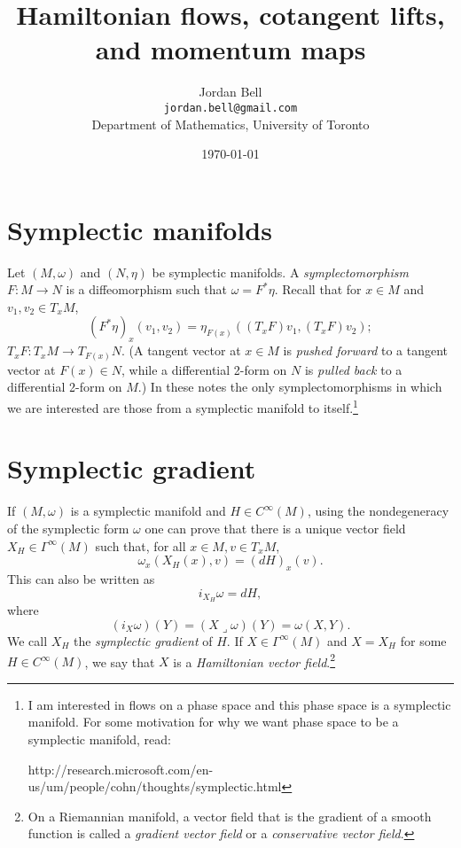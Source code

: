 \documentclass{article}
\begin{document}
\title{Hamiltonian flows, cotangent lifts, and momentum maps}
\author{Jordan Bell\\ \texttt{jordan.bell@gmail.com}\\Department of Mathematics, University of Toronto}
\date{\today}

\maketitle

\section{Symplectic manifolds}
Let $(M,\omega)$ and $(N,\eta)$ be symplectic manifolds. A {\em symplectomorphism} $F:M \to N$ is a diffeomorphism
such that $\omega=F^* \eta$. Recall that for $x \in M$ and $v_1,v_2 \in T_xM$,
\[
(F^* \eta)_x(v_1,v_2)=\eta_{F(x)}((T_x F)v_1,(T_x F)v_2);
\]
$T_x F: T_x M \to T_{F(x)}N$. (A tangent vector at $x \in M$ is {\em pushed forward} to a tangent vector at $F(x) \in N$, while a differential 2-form on $N$ is {\em pulled back} to a 
differential 2-form on $M$.) In these notes the only symplectomorphisms in which we are interested  are those from a symplectic manifold to itself.\footnote{I am interested in flows
on a phase space and this phase space is a symplectic manifold. For some motivation for why we want phase space to be a symplectic manifold, read:

 http://research.microsoft.com/en-us/um/people/cohn/thoughts/symplectic.html}

\section{Symplectic gradient}
If $(M,\omega)$ is a symplectic manifold and $H \in C^\infty(M)$, using the nondegeneracy of the symplectic form $\omega$ one can prove that there is a unique
vector field
$X_H \in \Gamma^\infty(M)$ 
such that, for all $x \in M, v \in T_xM$,
\[
\omega_x(X_H(x),v)=(dH)_x(v).
\]
This can also be written as 
\[
i_{X_H} \omega = dH,
\]
where 
\[
(i_X \omega)(Y)= (X \lrcorner \omega)(Y)=\omega(X,Y).
\]
We call $X_H$ the {\em symplectic gradient} of $H$. If $X \in \Gamma^\infty(M)$ and $X=X_H$ for some $H \in C^\infty(M)$, we say that $X$ is a {\em Hamiltonian vector
field}.\footnote{On a Riemannian manifold, a vector field that is the gradient of a smooth function is called a {\em gradient vector field} or a {\em conservative
vector field}.}
\end{document}
